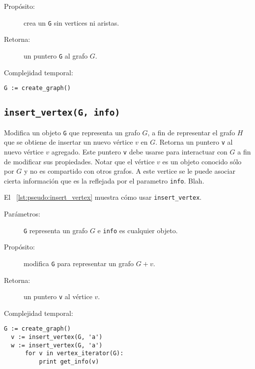 \documentclass[a4paper,12pt]{article}
\makeatletter
\newcommand{\Code}[1]{\lstinline[basicstyle={\tt}]@#1@}
\makeatother
\begin{document}
\begin{description}
  \item [Propósito:] crea un \Code{G} sin vertices ni aristas.
  \item [Retorna:] un puntero \Code{G} al grafo $G$.
  \item [Complejidad temporal:]
\end{description}


\begin{lstlisting}[caption={Ejemplo de uso de create\_graph},gobble=2,float=ht,label={lst:pseudo:create_graph},emph={create_graph}]
  G := create_graph()
\end{lstlisting}

\subsection{\texttt{insert\_vertex(G, info)}}
\label{sec:tad grafo:insert-vertex}

Modifica un objeto \Code{G} que representa un grafo $G$, a fin de representar el grafo $H$ que se obtiene de insertar un nuevo vértice $v$ en $G$.  Retorna un puntero \Code{v} al nuevo vértice $v$ agregado.  Este puntero \Code{v} debe usarse para interactuar con $G$ a fin de modificar sus propiedades.  Notar que el vértice $v$ es un objeto conocido sólo por $G$ y no es compartido con otros grafos.  A este vertice se le puede asociar cierta información que es la reflejada por el parametro \Code{info}.  Blah.

El \lstlistingname~\ref{lst:pseudo:insert_vertex} muestra cómo usar \texttt{insert\_vertex}.
  
\begin{description}
  \item [Parámetros:] \Code{G} representa un grafo $G$ e \Code{info} es cualquier objeto.
  \item [Propósito:] modifica \Code{G} para representar un grafo $G + v$.
  \item [Retorna:] un puntero \Code{v} al vértice $v$.
  \item [Complejidad temporal:]
\end{description}


\begin{lstlisting}[caption={Ejemplo de uso de insert\_vertex.  Crea un grafo $G$ con dos vértices, ambos con la letra ``a'' como información.  Luego, el ciclo imprime ``aa''. Ver Sección~\ref{sec:tad grafo:vertex-iterator} para más información de \texttt{vertex\_iterator}.},gobble=2,float=ht,label={lst:pseudo:insert_vertex},emph={insert_vertex}]
  G := create_graph()
  v := insert_vertex(G, 'a')
  w := insert_vertex(G, 'a')
      for v in vertex_iterator(G):
          print get_info(v)
\end{lstlisting}
\end{document}
